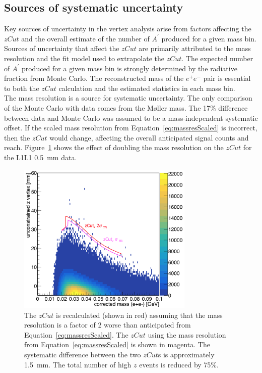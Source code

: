 \subsection{Sources of systematic uncertainty}
Key sources of uncertainty in the vertex analysis arise from factors affecting the $zCut$ and the overall estimate of the number of $A^{\prime}$ produced for a given mass bin. Sources of uncertainty that affect the $zCut$ are primarily attributed to the mass resolution and the fit model used to extrapolate the $zCut$. The expected number of $A^{\prime}$ produced for a given mass bin is strongly determined by the radiative fraction from Monte Carlo. The reconstructed mass of the $e^+e^-$ pair is essential to both the $zCut$ calculation and the estimated statistics in each mass bin.\\
\indent The mass resolution is  a source for systematic uncertainty. The only comparison of the Monte Carlo with data comes from the M\o ller mass. The 17$\%$ difference between data and Monte Carlo was assumed to be a mass-independent systematic offset. If the scaled mass resolution from Equation~\eqref{eq:massresScaled} is incorrect, then the $zCut$ would change, affecting the overall anticipated signal counts and reach. Figure~\ref{fig:mResdub} shows the effect of doubling the mass resolution on the $zCut$ for the L1L1 0.5~mm data. 
\begin{figure}[htb]
  \centering
      \includegraphics[width=0.75\textwidth]{pics/results/mres_systematics.png}
  \caption[$zCut$ when mass resolution is doubled]{The $zCut$ is recalculated (shown in red) assuming that the mass resolution is a factor of 2 worse than anticipated from Equation~\eqref{eq:massresScaled}. The $zCut$ using the mass resolution from Equation~\eqref{eq:massresScaled} is shown in magenta. The systematic difference between the two $zCut$s is approximately 1.5~mm. The total number of high $z$ events is reduced by 75$\%$.}
   \label{fig:mResdub}
\end{figure}
